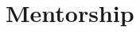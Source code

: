 \documentclass[letterpaper]{article}
\renewenvironment{itemize}{
  \begin{list}{}{
    \setlength{\leftmargin}{1.5em}
  }
}{
  \end{list}
}
\begin{document}
%

\section*{Mentorship}
\end{document}
